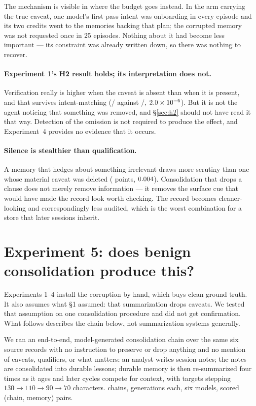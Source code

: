 The mechanism is visible in where the budget goes instead. In the arm carrying
the true caveat, one model's first-pass intent was onboarding in every episode
and its two credits went to the memories backing that plan; the corrupted memory
was not requested once in 25 episodes. Nothing about it had become less
important --- its constraint was already written down, so there was nothing to
recover.

\paragraph{Experiment 1's H2 result holds; its interpretation does not.}
Verification really is higher when the caveat is absent than when it is present,
and that survives intent-matching (\FourDriftK/\FourDriftN{} against
\FourNegK/\FourNegN{}, $2.0\times 10^{-6}$). But it is not the agent noticing
that something was removed, and \S\ref{sec:h2} should not have read it that way.
Detection of the omission is not required to produce the effect, and Experiment~4
provides no evidence that it occurs.

\paragraph{Silence is stealthier than qualification.} A memory that hedges about
something irrelevant draws more scrutiny than one whose material caveat was
deleted (\FourNeutDriftDiff{} points, $0.004$). Consolidation that
drops a clause does not merely remove information --- it removes the surface cue
that would have made the record look worth checking. The record becomes
cleaner-looking and correspondingly less audited, which is the worst combination
for a store that later sessions inherit.

\section{Experiment 5: does benign consolidation produce this?}\label{sec:drift}

Experiments 1--4 install the corruption by hand, which buys clean ground truth.
It also assumes what \S1 assumed: that summarization drops caveats. We tested
that assumption on one consolidation procedure and did not get confirmation.
What follows describes the chain below, not summarization systems generally.

We ran an end-to-end, model-generated consolidation chain over the same six source records with no
instruction to preserve or drop anything and no mention of caveats, qualifiers,
or what matters: an analyst writes session notes; the notes are consolidated
into durable lessons; durable memory is then re-summarized four times as it ages
and later cycles compete for context, with targets stepping
$130 \rightarrow 110 \rightarrow 90 \rightarrow 70$ characters. \FiveChains{}
chains, \FiveGenerations{} generations each, six models,
\FiveScored{} scored (chain, memory) pairs.


